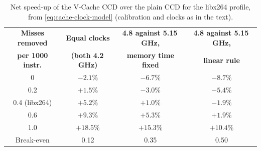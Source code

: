 \begin{table}[htbp]
  \centering
  \caption[Net speed-up of the V-Cache CCD over the plain CCD for the libx264 profile]{Net speed-up of the V-Cache CCD over the plain CCD for the libx264 profile, from \cref{eq:cache-clock-model} (calibration and clocks as in the text).}
  \label{tab:cache-clock-model}
  \small
  \begin{tabular}{@{}cccc@{}}
    \toprule
    \textbf{Misses removed} & \textbf{Equal clocks} & \textbf{4.8 against 5.15\,GHz,} & \textbf{4.8 against 5.15\,GHz,} \\
    \textbf{per 1000 instr.} & \textbf{(both 4.2\,GHz)} & \textbf{memory time fixed} & \textbf{linear rule} \\
    \midrule
    0 & $-2.1\%$ & $-6.7\%$ & $-8.7\%$ \\
    0.2 & $+1.5\%$ & $-3.0\%$ & $-5.4\%$ \\
    0.4 (libx264) & $+5.2\%$ & $+1.0\%$ & $-1.9\%$ \\
    0.6 & $+9.3\%$ & $+5.3\%$ & $+1.9\%$ \\
    1.0 & $+18.5\%$ & $+15.3\%$ & $+10.4\%$ \\
    \midrule
    Break-even & 0.12 & 0.35 & 0.50 \\
    \bottomrule
  \end{tabular}
\end{table}
